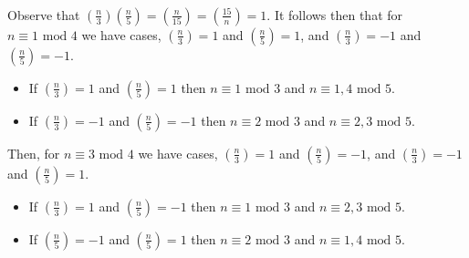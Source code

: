 \documentclass[class=article, crop=false]{standalone}
\def\leg#1#2{\left(\frac{#1}{#2}\right)}
\begin{document}
\subsubsection{}
Observe that $\leg{n}{3}\leg{n}{5}=\leg{n}{15}=\leg{15}{n}=1$.
  It follows then that for $n\equiv 1\mbox{ mod }4$ we have cases, $\leg{n}{3}=1$ and $\leg{n}{5}=1$,
  and $\leg{n}{3}=-1$ and $\leg{n}{5}=-1$.
  \begin{itemize}
    \item If $\leg{n}{3}=1$ and $\leg{n}{5}=1$ then $n\equiv1\mbox{ mod }3$ and $n\equiv 1,4\mbox{ mod }5$.
    \item If $\leg{n}{3}=-1$ and $\leg{n}{5}=-1$ then $n\equiv2\mbox{ mod }3$ and $n\equiv2,3\mbox{ mod }5$.
  \end{itemize}
  Then, for $n\equiv 3\mbox{ mod }4$ we have cases, $\leg{n}{3}=1$ and $\leg{n}{5}=-1$, and
  $\leg{n}{3}=-1$ and $\leg{n}{5}=1$.
  \begin{itemize}
    \item If $\leg{n}{3}=1$ and $\leg{n}{5}=-1$ then $n\equiv1\mbox{ mod }3$ and $n\equiv 2,3\mbox{ mod }5$.
    \item If $\leg{n}{5}=-1$ and $\leg{n}{5}=1$ then $n\equiv2\mbox{ mod }3$ and $n\equiv 1,4\mbox{ mod }5$.
  \end{itemize}
\end{document}

